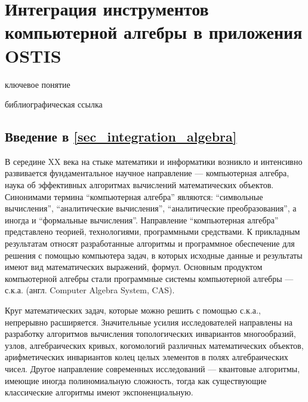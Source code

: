 \newpage

\section{Интеграция инструментов компьютерной алгебры в приложения OSTIS}
{\label{sec_integration_algebra}} 

\begin{SCn}

 \bigskip
 
 \begin{scnrelfromlist}{ключевое понятие}
 \end{scnrelfromlist}
 
 \bigskip
 
 \begin{scnrelfromlist}{библиографическая ссылка}
 \end{scnrelfromlist}
 
 \end{SCn}

\subsection*{Введение в \ref{sec_integration_algebra}}

В середине XX века на стыке математики и информатики возникло и интенсивно развивается фундаментальное научное направление --- компьютерная алгебра, наука об эффективных алгоритмах вычислений математических объектов. Синонимами термина ``компьютерная алгебра'' являются: ``символьные вычисления'', ``аналитические вычисления'', ``аналитические преобразования'', а иногда и ``формальные вычисления''. Направление ``компьютерная алгебра'' представлено теорией, технологиями, программными средствами. К прикладным результатам относят разработанные алгоритмы и программное обеспечение для решения с помощью компьютера задач, в которых исходные данные и результаты имеют вид математических выражений, формул. Основным продуктом компьютерной алгебры стали программные системы компьютерной алгебры --- с.к.а. (англ. Computer Algebra System, CAS). 

Круг математических задач, которые можно решить с помощью с.к.а., непрерывно расширяется. Значительные усилия исследователей направлены на разработку алгоритмов вычисления топологических инвариантов многообразий, узлов, алгебраических кривых, когомологий различных математических объектов, арифметических инвариантов колец целых элементов в полях алгебраических чисел. Другое направление современных исследований --- квантовые алгоритмы, имеющие иногда полиномиальную сложность, тогда как существующие классические алгоритмы имеют экспоненциальную.

